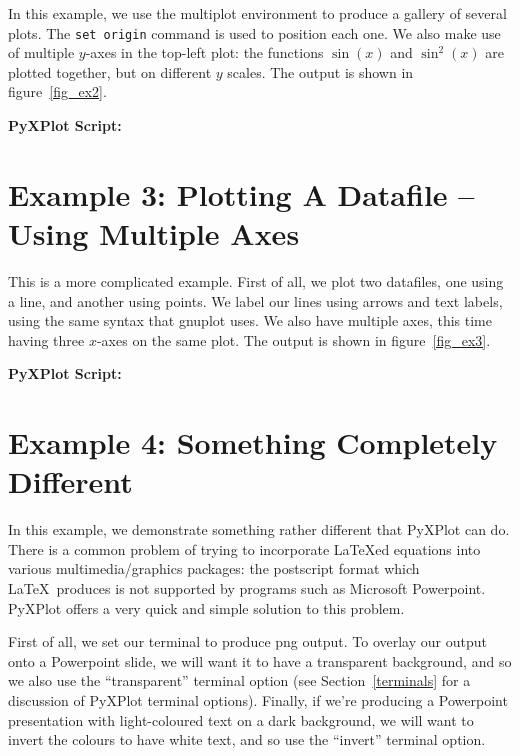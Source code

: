 \documentclass[a4paper,onecolumn,11pt]{book}
\begin{document}
In this example, we use the multiplot environment to produce a gallery of
several plots. The \texttt{set origin} command is used to position each one. We
also make use of multiple $y$-axes in the top-left plot: the functions
$\sin(x)$ and $\sin^2(x)$ are plotted together, but on different $y$ scales.
The output is shown in figure~\ref{fig_ex2}.

\vspace{1cm}
\noindent \textbf{PyXPlot Script:}


\newpage
\section{Example 3: Plotting A Datafile -- Using Multiple Axes}

This is a more complicated example. First of all, we plot two datafiles, one
using a line, and another using points. We label our lines using arrows and
text labels, using the same syntax that gnuplot uses. We also have multiple
axes, this time having three $x$-axes on the same plot. The output is shown in
figure~\ref{fig_ex3}.

\vspace{1cm}
\noindent \textbf{PyXPlot Script:}


\newpage
\section{Example 4: Something Completely Different}

\label{powerpoint_example}


In this example, we demonstrate something rather different that PyXPlot can
do. There is a common problem of trying to incorporate \LaTeX ed equations into
various multimedia/graphics packages: the postscript format which \LaTeX\
produces is not supported by programs such as Microsoft Powerpoint. PyXPlot
offers a very quick and simple solution to this problem.

First of all, we set our terminal to produce png output. To overlay our output
onto a Powerpoint slide, we will want it to have a transparent background, and
so we also use the ``transparent'' terminal option (see Section~\ref{terminals}
for a discussion of PyXPlot terminal options). Finally, if we're producing a
Powerpoint presentation with light-coloured text on a dark background, we will
want to invert the colours to have white text, and so use the ``invert''
terminal option.
\end{document}
